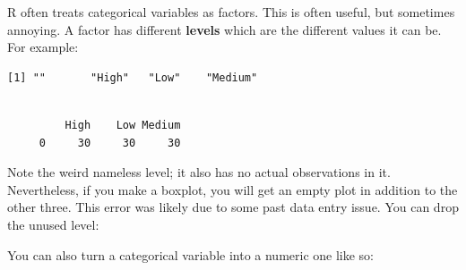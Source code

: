 \documentclass[
  letterpaper,
  DIV=11,
  numbers=noendperiod]{scrreprt}
\newenvironment{Shaded}{\begin{snugshade}}{\end{snugshade}}
\newcommand{\FunctionTok}[1]{\textcolor[rgb]{0.02,0.16,0.49}{#1}}
\newcommand{\NormalTok}[1]{\textcolor[rgb]{0.00,0.44,0.13}{#1}}
\newcommand{\OtherTok}[1]{\textcolor[rgb]{0.00,0.44,0.13}{#1}}
\newcommand{\SpecialCharTok}[1]{\textcolor[rgb]{0.25,0.44,0.63}{#1}}
\begin{document}
R often treats categorical variables as factors. This is often useful,
but sometimes annoying. A factor has different \textbf{levels} which are
the different values it can be. For example:

\begin{Shaded}
\end{Shaded}

\begin{verbatim}
[1] ""       "High"   "Low"    "Medium"
\end{verbatim}

\begin{Shaded}
\end{Shaded}

\begin{verbatim}

         High    Low Medium 
     0     30     30     30 
\end{verbatim}

Note the weird nameless level; it also has no actual observations in it.
Nevertheless, if you make a boxplot, you will get an empty plot in
addition to the other three. This error was likely due to some past data
entry issue. You can drop the unused level:

\begin{Shaded}
\end{Shaded}

You can also turn a categorical variable into a numeric one like so:

\begin{Shaded}
\end{Shaded}
\end{document}
